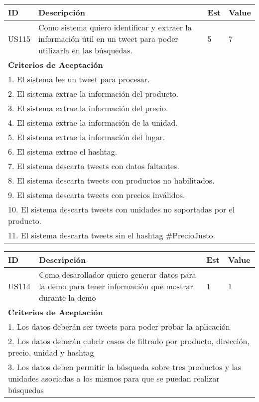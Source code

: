 \bigskip
\begin{tabular}{|p{1cm}|p{10cm}|p{1cm}|p{1cm}|}
\hline
\hline
\textbf{ID}&\textbf{Descripción}&\textbf{Est}&\textbf{Value}\\
\hline
\hline
US115&Como sistema quiero identificar y extraer la información útil en un tweet para poder utilizarla en las búsquedas.&5&7\\
\hline
\hline
\multicolumn{4}{|p{13cm}|}{ \textbf{Criterios de Aceptación}} \\
\hline
\hline
\multicolumn{4}{|p{13cm}|}{1. El sistema lee un tweet para procesar.}\\
\multicolumn{4}{|p{13cm}|}{2. El sistema extrae la información del producto.}\\
\multicolumn{4}{|p{13cm}|}{3. El sistema extrae la información del precio.}\\
\multicolumn{4}{|p{13cm}|}{4. El sistema extrae la información de la unidad.}\\
\multicolumn{4}{|p{13cm}|}{5. El sistema extrae la información del lugar.}\\
\multicolumn{4}{|p{13cm}|}{6. El sistema extrae el hashtag.}\\
\multicolumn{4}{|p{13cm}|}{7. El sistema descarta tweets con datos faltantes.}\\
\multicolumn{4}{|p{13cm}|}{8. El sistema descarta tweets con productos no habilitados.}\\
\multicolumn{4}{|p{13cm}|}{9. El sistema descarta tweets con precios inválidos.}\\
\multicolumn{4}{|p{13cm}|}{10. El sistema descarta tweets con unidades no soportadas por el producto.}\\
\multicolumn{4}{|p{13cm}|}{11. El sistema descarta tweets sin el hashtag $\#$PrecioJusto.}\\
\hline
\hline
\end{tabular}


\bigskip
\begin{tabular}{|p{1cm}|p{10cm}|p{1cm}|p{1cm}|}
\hline
\hline
\textbf{ID}&\textbf{Descripción}&\textbf{Est}&\textbf{Value}\\
\hline
\hline
US114&Como desarollador quiero generar datos para la demo para tener información que mostrar durante la demo&1&1\\
\hline
\hline
\multicolumn{4}{|p{13cm}|}{ \textbf{Criterios de Aceptación}} \\
\hline
\hline
\multicolumn{4}{|p{13cm}|}{1. Los datos deberán ser tweets para poder probar la aplicación}\\
\multicolumn{4}{|p{13cm}|}{2. Los datos deberán cubrir casos de filtrado por producto, dirección, precio, unidad y hashtag}\\
\multicolumn{4}{|p{13cm}|}{3. Los datos deben permitir la búsqueda sobre tres productos y las unidades asociadas a los mismos para que se puedan realizar búsquedas}\\
\hline
\hline
\end{tabular}


